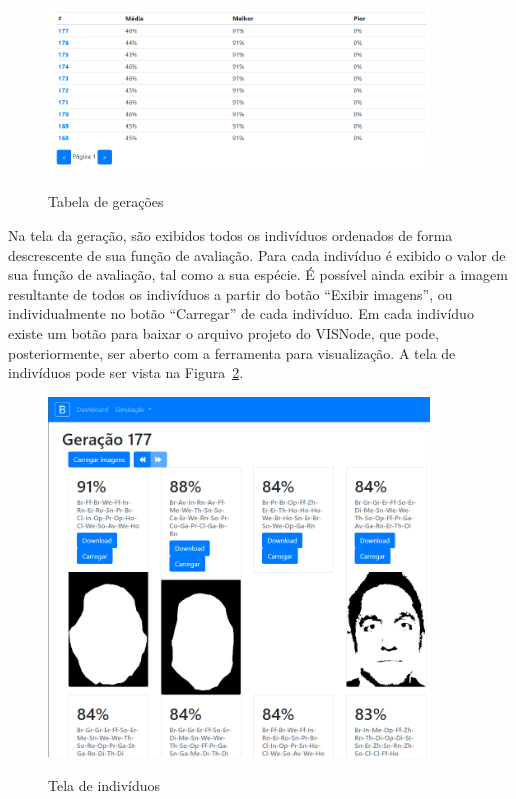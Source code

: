 \documentclass[12pt,oneside,a4paper,english,french,spanish,brazil,]{abntex2}
\begin{document}
\begin{figure}[ht]
\centering
\caption{Tabela de gerações}
\includegraphics[width=0.9\textwidth]{imagens/Print_2.png}
\sourceAuthor{}
\label{fig:Print_2}
\end{figure}

Na tela da geração, são exibidos todos os indivíduos ordenados de forma descrescente de sua função de avaliação. Para cada indivíduo é exibido o valor de sua função de avaliação, tal como a sua espécie. É possível ainda exibir a imagem resultante de todos os indivíduos a partir do botão ``Exibir imagens'', ou individualmente no botão ``Carregar'' de cada indivíduo. Em cada indivíduo existe um botão para baixar o arquivo projeto do VISNode, que pode, posteriormente, ser aberto com a ferramenta para visualização. A tela de indivíduos pode ser vista na Figura~\ref{fig:Print_3}.

\begin{figure}[ht]
\centering
\caption{Tela de indivíduos}
\includegraphics[width=0.9\textwidth]{imagens/Print_3.png}
\sourceAuthor{}
\label{fig:Print_3}
\end{figure}
\end{document}
